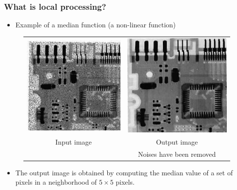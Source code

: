 \documentclass[english,11pt,table,handout]{beamer}
\begin{document}
\frame
{
	\frametitle{What is local processing?}
	\begin{itemize}
		\item Example of a median function (a non-linear function)
	\end{itemize}
	\centering
	\begin{figure}[!h]
		\begin{tabular}{cc}
			\includegraphics[scale=0.57]{image_salt_peper.png} &
			\includegraphics[scale=0.57]{image_salt_peper_denoise.png} \\
			Input image & Output image\\
				& Noises have been removed
		\end{tabular}
	\end{figure}
	
	\begin{itemize}
		\item The output image is obtained by computing the median value of a set of pixels in a neighborhood of $5 \times 5$ pixels.
	\end{itemize}
}
\end{document}
